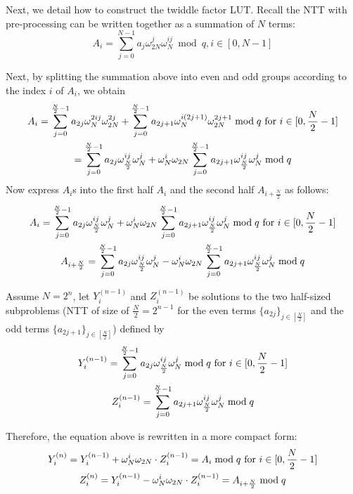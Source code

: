 \documentclass{iacrtrans}
\theoremstyle{plain}
\begin{document}
Next, we detail how to construct the twiddle factor LUT. Recall the NTT with pre-processing can be written together as a summation of $N$ terms:
\[
    A_i = \sum_{j=0}^{N-1}a_j\omega_{2N}^j\omega_N^{ij} \bmod q, i\in [0,N-1]
\]

Next, by splitting the summation above into even and odd groups according to the index $i$ of $A_i$, we obtain
\begin{gather}
    A_i = \sum_{j=0}^{\frac{N}{2}-1}a_{2j}\omega_N^{2ij}\omega_{2N}^{2j}  + \sum_{j=0}^{\frac{N}{2}-1}a_{2j+1}\omega_N^{i(2j+1)}\omega_{2N}^{2j+1} \bmod q \text{ for } i\in [0,\frac{N}{2}-1]\notag\\
    = \sum_{j=0}^{\frac{N}{2}-1}a_{2j}\omega_{\frac{N}{2}}^{ij}\omega_{N}^{j}  + \omega_{N}^i\omega_{2N}\sum_{j=0}^{\frac{N}{2}-1}a_{2j+1}\omega_{\frac{N}{2}}^{ij}\omega_N^{j} \bmod q \notag
\end{gather}
Now express $A_i$s into the first half $A_{i}$ and the second half $A_{i+\frac{N}{2}}$ as follows: 
\begin{gather}
    A_i = \sum_{j=0}^{\frac{N}{2}-1}a_{2j}\omega_{\frac{N}{2}}^{ij}\omega_{N}^{j}  + \omega_{N}^i\omega_{2N}\sum_{j=0}^{\frac{N}{2}-1}a_{2j+1}\omega_{\frac{N}{2}}^{ij}\omega_N^{j} \bmod q \text{ for } i\in [0,\frac{N}{2}-1]\notag\\
   A_{i+\frac{N}{2}} = \sum_{j=0}^{\frac{N}{2}-1}a_{2j}\omega_{\frac{N}{2}}^{ij}\omega_{N}^{j}  - \omega_{N}^i\omega_{2N}\sum_{j=0}^{\frac{N}{2}-1}a_{2j+1}\omega_{\frac{N}{2}}^{ij}\omega_N^{j} \bmod q \notag
\end{gather}

Assume $N=2^n$, let $Y_i^{(n-1)}$ and $Z_i^{(n-1)}$ be solutions to the two half-sized subproblems (NTT of size of $\frac{N}{2}=2^{n-1}$ for the even terms $\{a_{2j}\}_{j\in [\frac{N}{2}]}$ and the odd terms $\{a_{2j+1}\}_{j\in [\frac{N}{2}]}$) defined by
\begin{gather}
    Y_i^{(n-1)} = \sum_{j=0}^{\frac{N}{2}-1}a_{2j}\omega_{\frac{N}{2}}^{ij}\omega_{N}^{j} \bmod q \text{ for } i\in [0,\frac{N}{2}-1]\notag\\
    Z_i^{(n-1)} = \sum_{j=0}^{\frac{N}{2}-1}a_{2j+1}\omega_{\frac{N}{2}}^{ij}\omega_N^{j} \bmod q \notag
\end{gather}

Therefore, the equation above is rewritten in a more compact form:
\begin{gather}
    Y_i^{(n)} = Y_i^{(n-1)} + \omega_{N}^i\omega_{2N}\cdot Z_i^{(n-1)} = A_i\bmod q \text{ for } i\in [0,\frac{N}{2}-1]\notag\\
    Z_i^{(n)} = Y_i^{(n-1)} - \omega_{N}^i\omega_{2N}\cdot Z_i^{(n-1)} = A_{i+\frac{N}{2}} \bmod q \notag
\end{gather}
\end{document}
